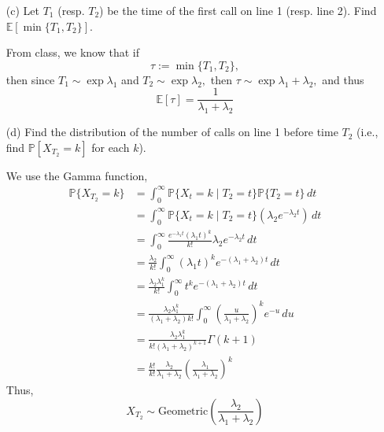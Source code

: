 \documentclass[11pt]{article}
\newcommand{\bbE}{\mathbb{E}}
\newcommand{\bbP}{\mathbb{P}}
\begin{document}
\begin{enumerate}
\begin{solution}
    \end{solution}
    \item[(c)] Let \(T_1\) (resp. \(T_2\)) be the time of the first call on line 1 (resp. line 2). Find \(\mathbb{E}[\min\{T_1, T_2\}]\).
    \begin{solution}
        From class, we know that if 
        \[\tau := \min\{T_1, T_2\},\] then since $T_1 \sim \exp{\lambda_1}$ and $T_2 \sim \exp{\lambda_2},$ then $\tau \sim \exp{\lambda_1 + \lambda_2},$ and thus 
        \[\bbE[\tau] = \boxed{\frac{1}{\lambda_1 + \lambda_2}}\]
    \end{solution}
    \item[(d)] Find the distribution of the number of calls on line 1 before time \(T_2\) (i.e., find \(\mathbb{P}[X_{T_2} = k]\) for each \(k\)).
    \begin{solution}
We use the Gamma function,
\begin{align*}
    \bbP\{X_{T_2} = k\} &= \int_0^\infty \bbP\{X_t = k \mid T_2 = t\}\bbP\{T_2 = t\}\, dt\\
    &= \int_0^\infty \bbP\{X_t = k \mid T_2 = t\}(\lambda_2e^{-\lambda_2 t})\, dt\\
    &= \int_0^\infty \frac{e^{-\lambda_1 t}(\lambda_1t)^k}{k!}\lambda_2 e^{-\lambda_2 t}\, dt\\
    &= \frac{\lambda_2}{k!}\int_0^\infty (\lambda_1 t)^k e^{-(\lambda_1 + \lambda_2)t}\, dt\\
    &= \frac{\lambda_2 \lambda_1^k}{k!}\int_0^\infty  t^k e^{-(\lambda_1 + \lambda_2)t}\, dt\\
    &= \frac{\lambda_2 \lambda_1^k}{(\lambda_1 + \lambda_2)k!}\int_0^\infty (\frac{u}{\lambda_1 + \lambda_2})^k e^{-u}\, du\\
    &= \frac{\lambda_2 \lambda_1^k}{k!(\lambda_1 + \lambda_2)^{k+1}}\Gamma(k + 1)\\
    &= \frac{k!}{k!} \frac{\lambda_2}{\lambda_1 + \lambda_2} \left(\frac{\lambda_1}{\lambda_1 + \lambda_2}\right)^k
\end{align*}
Thus, 
\[\boxed{X_{T_2} \sim \text{Geometric}( \frac{\lambda_2}{\lambda_1 + \lambda_2})}\]
    \end{solution}
\end{enumerate}

\newpage
\end{document}
